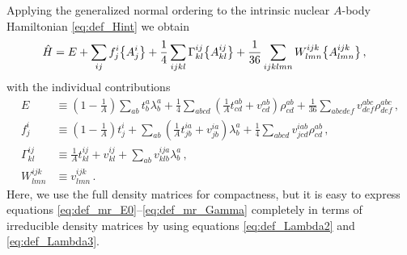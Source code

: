 {Applying the generalized normal ordering to the intrinsic nuclear $A$-body 
Hamiltonian \eqref{eq:def_Hint} we obtain
\begin{align}
  \hat{H} &= E 
        + \sum_{ij}f^{i}_{j}\big\{A^{i}_{j}\big\} 
        + \frac{1}{4}\sum_{ijkl}\Gamma^{ij}_{kl}\big\{A^{ij}_{kl}\big\}
        + \frac{1}{36}\sum_{ijklmn}W^{ijk}_{lmn}\big\{A^{ijk}_{lmn}\big\}\,,
\end{align}
with the individual contributions 
\begin{align}
  E &\equiv \left(1-\frac{1}{A}\right)\sum_{ab}t^{a}_{b}\lambda^{a}_{b}
        + \frac{1}{4}\sum_{abcd}\left(\frac{1}{A}t^{ab}_{cd} + v^{ab}_{cd}\right)\rho^{ab}_{cd}
      + \frac{1}{36}\sum_{abcdef}v^{abc}_{def} \rho^{abc}_{def}\,,
      \label{eq:def_mr_E0}\\
%
  f^{i}_{j} &\equiv \left(1-\frac{1}{A}\right)t^{i}_{j} + \sum_{ab}\left(\frac{1}{A}t^{ia}_{jb} + v^{ia}_{jb}\right)\lambda^{a}_{b}
  + \frac{1}{4}\sum_{abcd}v^{iab}_{jcd}\rho^{ab}_{cd}\,,\label{eq:def_mr_f}   \\
% 
  \Gamma^{ij}_{kl} &\equiv \frac{1}{A}t^{ij}_{kl} + v^{ij}_{kl} + \sum_{ab}v^{ija}_{klb}\lambda^{a}_{b}\,,\label{eq:def_mr_Gamma}\\
  W^{ijk}_{lmn}&\equiv v^{ijk}_{lmn}\,.
\end{align}
Here, we use the full density matrices for compactness, but it is easy to express
equations \eqref{eq:def_mr_E0}--\eqref{eq:def_mr_Gamma} completely in terms of irreducible density
matrices by using equations \eqref{eq:def_Lambda2} and \eqref{eq:def_Lambda3}. 

%
%
}
